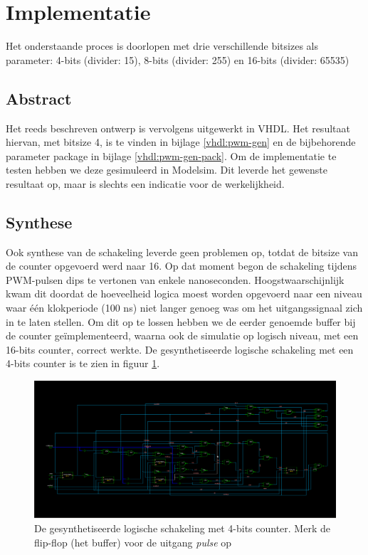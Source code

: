 \documentclass{article}
\begin{document}
\section{Implementatie}
\label{sec:pwm-impl}
\footnotesize
Het onderstaande proces is doorlopen met drie verschillende bitsizes als parameter: 4-bits (divider: 15), 8-bits (divider: 255) en 16-bits (divider: 65535)

\normalsize
\subsection{Abstract}
\label{ssec:pwm-impl-abstr}
Het reeds beschreven ontwerp is vervolgens uitgewerkt in VHDL. Het resultaat hiervan, met bitsize 4, is te vinden in bijlage \ref{vhdl:pwm-gen} en de bijbehorende parameter package in bijlage \ref{vhdl:pwm-gen-pack}. Om de implementatie te testen hebben we deze gesimuleerd in Modelsim. Dit leverde het gewenste resultaat op, maar is slechts een indicatie voor de werkelijkheid.

\subsection{Synthese}
\label{ssec:pwm-impl-synth}
Ook synthese van de schakeling leverde geen problemen op, totdat de bitsize van de counter opgevoerd werd naar 16. Op dat moment begon de schakeling tijdens PWM-pulsen dips te vertonen van enkele nanoseconden. Hoogstwaarschijnlijk kwam dit doordat de hoeveelheid logica moest worden opgevoerd naar een niveau waar één klokperiode (100 ns) niet langer genoeg was om het uitgangssignaal zich in te laten stellen. Om dit op te lossen hebben we de eerder genoemde buffer bij de counter geïmplementeerd, waarna ook de simulatie op logisch niveau, met een 16-bits counter, correct werkte.
De gesynthetiseerde logische schakeling met een 4-bits counter is te zien in figuur \ref{fig:pwm-logic}.

\begin{figure}[H]
	\centering
	\includegraphics[width=\textwidth]{resource/pwm_gen_logic.png}
	\caption{De gesynthetiseerde logische schakeling met 4-bits counter. Merk de flip-flop (het buffer) voor de uitgang \textit{pulse} op}
	\label{fig:pwm-logic}
\end{figure}
\end{document}
